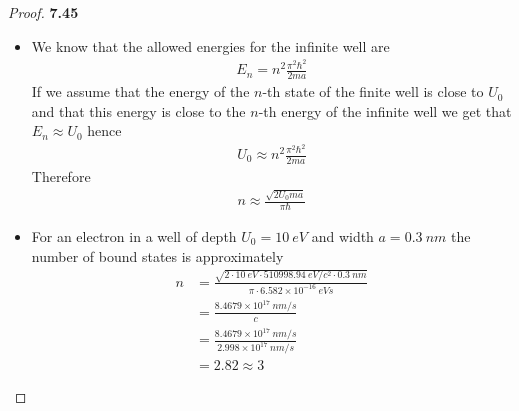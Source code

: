 \documentclass[11pt]{article}
\theoremstyle{definition}
\begin{document}
\cleardoublepage
\begin{proof}{\textbf{7.45}}
\begin{itemize}
\item [\textbf{(a)}] We know that the allowed energies for the infinite well
are
\begin{align*}
    E_n = n^2\frac{\pi^2\hbar^2}{2ma}
\end{align*}
If we assume that the energy of the $n$-th state of the finite well is close
to $U_0$ and that this energy is close to the $n$-th energy of the infinite
well we get that $E_n \approx U_0$ hence
\begin{align*}
    U_0 \approx n^2\frac{\pi^2\hbar^2}{2ma}
\end{align*}
Therefore
\begin{align*}
    n \approx \frac{\sqrt{2U_0ma}}{\pi\hbar}
\end{align*}

\item [\textbf{(b)}] For an electron in a well of depth $U_0 = 10~eV$ and width
$a = 0.3~nm$ the number of bound states is approximately 
\begin{align*}
    n &=
    \frac{\sqrt{2\cdot 10~eV \cdot 510998.94~eV/c^2 \cdot 0.3~nm}}
    {\pi\cdot 6.582\times 10^{-16}~eVs}\\
    &= \frac{8.4679 \times 10^{17}~nm/s}{c}\\
    &= \frac{8.4679 \times 10^{17}~nm/s}{2.998\times 10^{17}~nm/s}\\
    &= 2.82 \approx 3
\end{align*}
\end{itemize}
\end{proof}
\end{document}
